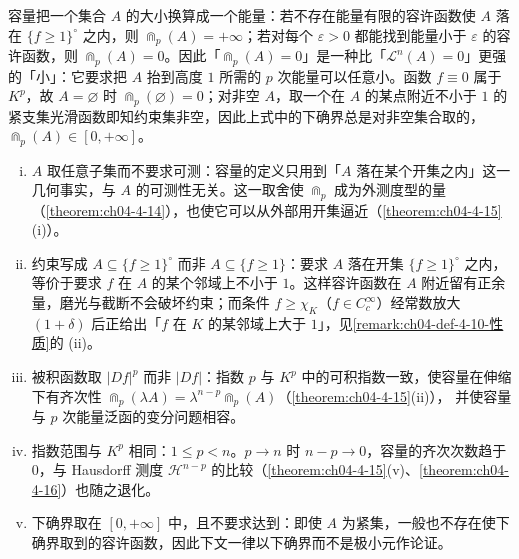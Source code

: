 \documentclass[../../main.tex]{subfiles}%
\begin{document}
\begin{remark}\label{remark:ch04-def-4-10-动机}
容量把一个集合 $A$ 的大小换算成一个能量：若不存在能量有限的容许函数使 $A$ 落在 $\{f\geqslant1\}^{\circ}$ 之内，则 $\Cap_p(A)=+\infty$；若对每个 $\varepsilon>0$ 都能找到能量小于 $\varepsilon$ 的容许函数，则 $\Cap_p(A)=0$。因此「$\Cap_p(A)=0$」是一种比「$\mathcal{L}^n(A)=0$」更强的「小」：它要求把 $A$ 抬到高度 $1$ 所需的 $p$ 次能量可以任意小。函数 $f\equiv0$ 属于 $K^p$，故 $A=\varnothing$ 时 $\Cap_p(\varnothing)=0$；对非空 $A$，取一个在 $A$ 的某点附近不小于 $1$ 的紧支集光滑函数即知约束集非空，因此上式中的下确界总是对非空集合取的，$\Cap_p(A)\in[0,+\infty]$。
\end{remark}

\begin{remark}\label{remark:ch04-def-4-10-条件}
\begin{enumerate}[(i)]
\item $A$ 取任意子集而不要求可测：容量的定义只用到「$A$ 落在某个开集之内」这一几何事实，与 $A$ 的可测性无关。这一取舍使 $\Cap_p$ 成为外测度型的量（\cref{theorem:ch04-4-14}），也使它可以从外部用开集逼近（\cref{theorem:ch04-4-15}(i)）。%
\item 约束写成 $A\subseteq\{f\geqslant1\}^{\circ}$ 而非 $A\subseteq\{f\geqslant1\}$：要求 $A$ 落在开集 $\{f\geqslant1\}^{\circ}$ 之内，等价于要求 $f$ 在 $A$ 的某个邻域上不小于 $1$。这样容许函数在 $A$ 附近留有正余量，磨光与截断不会破坏约束；而条件 $f\geqslant\chi_K$（$f\in C_c^{\infty}$）经常数放大 $(1+\delta)$ 后正给出「$f$ 在 $K$ 的某邻域上大于 $1$」，见\cref{remark:ch04-def-4-10-性质}的 (ii)。%
\item 被积函数取 $\lvert Df\rvert^p$ 而非 $\lvert Df\rvert$：指数 $p$ 与 $K^p$ 中的可积指数一致，使容量在伸缩下有齐次性 $\Cap_p(\lambda A)=\lambda^{n-p}\Cap_p(A)$（\cref{theorem:ch04-4-15}(ii)），%
并使容量与 $p$ 次能量泛函的变分问题相容。
\item 指数范围与 $K^p$ 相同：$1\leqslant p<n$。$p\to n$ 时 $n-p\to0$，容量的齐次次数趋于 $0$，与 Hausdorff 测度 $\mathcal{H}^{n-p}$ 的比较（\cref{theorem:ch04-4-15}(v)、\cref{theorem:ch04-4-16}）也随之退化。%
\item 下确界取在 $[0,+\infty]$ 中，且不要求达到：即使 $A$ 为紧集，一般也不存在使下确界取到的容许函数，因此下文一律以下确界而不是极小元作论证。
\end{enumerate}
\end{remark}
\end{document}
